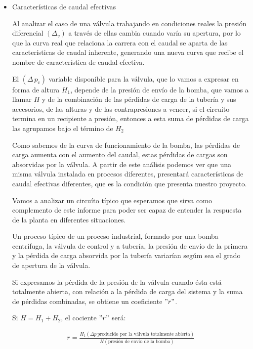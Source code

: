 \begin{itemize}
  \item Características de caudal efectivas
  
  Al analizar el caso de una válvula trabajando en condiciones reales la 
  presión diferencial ${(\Delta_v)}$ a través de ellas cambia cuando varía su
  apertura, por lo que la curva real que relaciona la carrera con el caudal
  se aparta de las características de caudal inherente, generando una nueva 
  curva que recibe el nombre de característica de caudal efectiva.
  
  El ${(\Delta \,p_v)}$ variable disponíble para la válvula, que lo vamos a 
  expresar en forma de altura ${H_1}$, depende de la presión de envío de la 
  bomba, que vamos a llamar ${H}$ y de la combinación de las pérdidas de carga
  de la tubería y sus accesorios, de las alturas y de las contrapresiones a 
  vencer, si el circuito termina en un recipiente a presión, entonces a esta 
  suma de pérdidas de carga las agrupamos bajo el término de ${H_2}$
  
  Como sabemos de la curva de funcionamiento de la bomba, las pérdidas de carga
  aumenta con el aumento del caudal, estas pérdidas de cargas son absorvidas 
  por la válvula.
  A partir de este análisis podemos ver que una misma válvula instalada en
  procesos diferentes, presentará características de caudal efectivas diferentes,
  que es la condición que presenta nuestro proyecto.
  
  Vamos a analizar un circuíto típico que esperamos que sirva como complemento
  de este informe para poder ser capaz de entender la respuesta de la planta en 
  diferentes situaciones.
  
  Un proceso típico de un proceso industrial, formado por una bomba centrífuga, 
  la válvula de control y a tubería, la presión de envío de la primera y la pérdida
  de carga absorvida por la tubería variarían segúm sea el grado de apertura 
  de la válvula.
  
  Si expresamos la pérdida de la presión de la válvula cuando ésta está totalmente
  abierta, con relación a la pérdida de carga del sistema y la suma de pérdidas 
  combinadas, se obtiene un coeficiente ${"r"}$.
  
  Si ${H = H_1 + H_2}$, el cociente ${"r"}$ será:
  
  \begin{align}
	r = \frac{H_1(\Delta p \, \text{producido por la válvula totalmente abierta})}
	{H(\text{presión de envío de la bomba})}
    \end{align}
    

\end{itemize}

